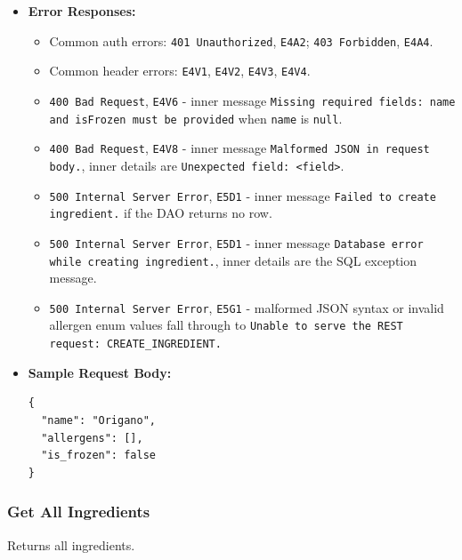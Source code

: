 \begin{itemize}[nosep]
\item \textbf{Error Responses:}

\begin{itemize}[nosep]
\item Common auth errors: \texttt{401 Unauthorized}, \texttt{E4A2}; \texttt{403 Forbidden}, \texttt{E4A4}.
\item Common header errors: \texttt{E4V1}, \texttt{E4V2}, \texttt{E4V3}, \texttt{E4V4}.
\item \texttt{400 Bad Request}, \texttt{E4V6} - inner message \texttt{Missing required fields: name and isFrozen must be provided} when \texttt{name} is \texttt{null}.
\item \texttt{400 Bad Request}, \texttt{E4V8} - inner message \texttt{Malformed JSON in request body.}, inner details are \texttt{Unexpected field: <field>}.
\item \texttt{500 Internal Server Error}, \texttt{E5D1} - inner message \texttt{Failed to create ingredient.} if the DAO returns no row.
\item \texttt{500 Internal Server Error}, \texttt{E5D1} - inner message \texttt{Database error while creating ingredient.}, inner details are the SQL exception message.
\item \texttt{500 Internal Server Error}, \texttt{E5G1} - malformed JSON syntax or invalid allergen enum values fall through to \texttt{Unable to serve the REST request: CREATE\_INGREDIENT.}
\end{itemize}

\item \textbf{Sample Request Body:}

\begin{lstlisting}
{
  "name": "Origano",
  "allergens": [],
  "is_frozen": false
}
\end{lstlisting}
\end{itemize}

\subsubsection*{Get All Ingredients}

Returns all ingredients.


